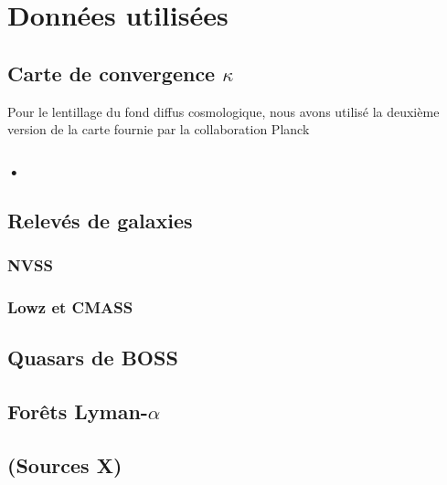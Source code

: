
\chapter{Données utilisées} %

\label{Chapter6} %



\section{Carte de convergence $\kappa$}

Pour le lentillage du fond diffus cosmologique, nous avons utilisé la deuxième version de la carte fournie par la collaboration Planck 

\subsection{•}


\section{Relevés de galaxies}
\subsection{NVSS}
\subsection{Lowz et CMASS}
\section{Quasars de BOSS}
\section{Forêts Lyman-$\alpha$}
\section{(Sources X)}
